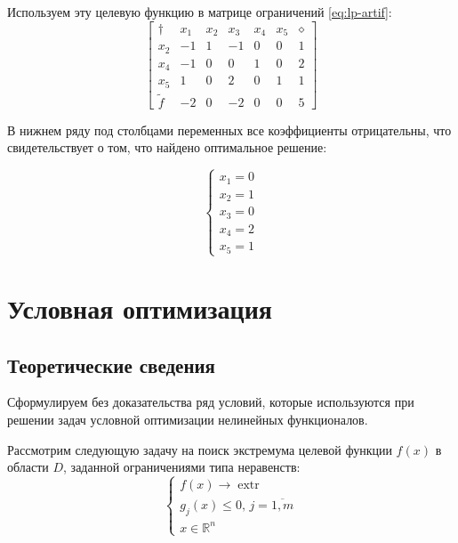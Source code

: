 \documentclass{article}
\renewcommand{\leq}{\leqslant}
\providecommand{\set}[1]{\mathbb{#1}}
\DeclareMathOperator{\extr}{extr}
\theoremstyle{remark}
\theoremstyle{definition}
\numberwithin{equation}{section}
\begin{document}
Используем эту целевую функцию в матрице ограничений \eqref{eq:lp-artif}:
\begin{equation*}
  \begin{bmatrix}
    \dagger & x_1 & x_2 & x_3 & x_4 & x_5 & \diamond\\
    x_2 & -1 & 1 & -1 & 0 & 0 & 1\\
    x_4 & -1 & 0 &  0 & 1 & 0 & 2\\
    x_5 &  1 & 0 &  2 & 0 & 1 & 1\\
    \tilde{f} & -2 & 0 & -2 & 0 & 0 & 5
  \end{bmatrix}
\end{equation*}

В нижнем ряду под столбцами переменных все коэффициенты отрицательны,
что свидетельствует о том, что найдено оптимальное решение:

\begin{equation}
  \begin{cases}
    x_1 = 0\\
    x_2 = 1\\
    x_3 = 0\\
    x_4 = 2\\
    x_5 = 1
  \end{cases}
\end{equation}

\clearpage
\section{Условная оптимизация}
\label{sec:kuhn-tucker}

\subsection{Теоретические сведения}

Сформулируем без доказательства ряд условий, которые используются при
решении задач условной оптимизации нелинейных функционалов. 

Рассмотрим следующую задачу на поиск экстремума целевой функции $f(x)$
в области $D$, заданной ограничениями типа неравенств:
\begin{equation}
  \label{eq:cond-optim-problem-form}
  \begin{cases}
    f(x) \to \extr \\
    g_j(x) \leq 0,\, j=\overline{1,m} \\
    x \in \set{R}^n
  \end{cases}
\end{equation}
\end{document}
